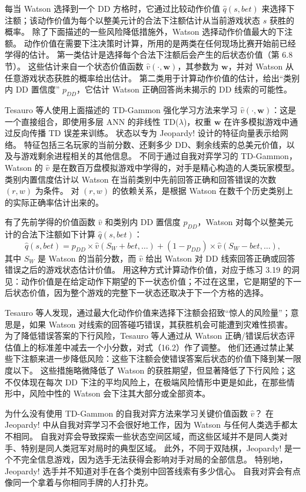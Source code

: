 \documentclass[UTF8,12pt,a4paper,fontset=fandol]{ctexart}
\begin{document}
每当 Watson 选择到一个 DD 方格时，它通过比较动作价值 $\hat q(s,bet)$ 来选择下注额；该动作价值为每个以整美元计的合法下注额估计从当前游戏状态 $s$ 获胜的概率。
除了下面描述的一些风险降低措施外，Watson 选择动作价值最大的下注额。
动作价值在需要下注决策时计算，所用的是两类在任何现场比赛开始前已经学得的估计。
第一类估计是选择每个合法下注额后会产生的后状态价值（第 6.8 节）。
这些估计来自一个状态价值函数 $\hat v(\cdot,\mathbf{w})$，其参数为 $\mathbf{w}$，并对 Watson 从任意游戏状态获胜的概率给出估计。
第二类用于计算动作价值的估计，给出“类别内 DD 置信度” $p_{DD}$，它估计 Watson 正确回答尚未揭示的 DD 线索的可能性。

Tesauro 等人使用上面描述的 TD-Gammon 强化学习方法来学习 $\hat v(\cdot,\mathbf{w})$：这是一个直接组合，即使用多层 ANN 的非线性 TD($\lambda$)，权重 $\mathbf{w}$ 在许多模拟游戏中通过反向传播 TD 误差来训练。
状态以专为 Jeopardy! 设计的特征向量表示给网络。
特征包括三名玩家的当前分数、还剩多少 DD、剩余线索的总美元价值，以及与游戏剩余进程相关的其他信息。
不同于通过自我对弈学习的 TD-Gammon，Watson 的 $\hat v$ 是在数百万盘模拟游戏中学得的，对手是精心构造的人类玩家模型。
类别内置信度估计以 Watson 在当前类别中先前回答正确和回答错误的次数 $(r,w)$ 为条件。
对 $(r,w)$ 的依赖关系，是根据 Watson 在数千个历史类别上的实际正确率估计出来的。

有了先前学得的价值函数 $\hat v$ 和类别内 DD 置信度 $p_{DD}$，Watson 对每个以整美元计的合法下注额如下计算 $\hat q(s,bet)$：
\begin{equation}
\hat q(s,bet)=p_{DD}\times \hat v(S_W+bet,\ldots)
+(1-p_{DD})\times \hat v(S_W-bet,\ldots),
\tag{16.2}
\end{equation}
其中 $S_W$ 是 Watson 的当前分数，而 $\hat v$ 给出 Watson 对 DD 线索回答正确或回答错误之后的游戏状态估计价值。
用这种方式计算动作价值，对应于练习 3.19 的洞见：动作价值是在给定动作下期望的下一状态价值；不过在这里，它是期望的下一后状态价值，因为整个游戏的完整下一状态还取决于下一个方格的选择。

Tesauro 等人发现，通过最大化动作价值来选择下注额会招致“惊人的风险量”；意思是，如果 Watson 对线索的回答碰巧错误，其获胜机会可能遭到灾难性损害。
为了降低错误答案的下行风险，Tesauro 等人通过从 Watson 正确/错误后状态评估值上的标准差中减去一个小分数，对式（16.2）作了调整。
他们还通过禁止某些下注额来进一步降低风险：这些下注额会使错误答案后状态的价值下降到某一限度以下。
这些措施略微降低了 Watson 的获胜期望，但显著降低了下行风险；这不仅体现在每次 DD 下注的平均风险上，在极端风险情形中更是如此，在那些情形中，风险中性的 Watson 会下注其大部分或全部资本。

为什么没有使用 TD-Gammon 的自我对弈方法来学习关键价值函数 $\hat v$？
在 Jeopardy! 中从自我对弈学习不会很好地工作，因为 Watson 与任何人类选手都太不相同。
自我对弈会导致探索一些状态空间区域，而这些区域并不是同人类对手、特别是同人类冠军对局时的典型区域。
此外，不同于双陆棋，Jeopardy! 是一个不完全信息游戏，因为选手无法获得会影响对手对局的全部信息。
特别地，Jeopardy! 选手并不知道对手在各个类别中回答线索有多少信心。
自我对弈会有点像同一个拿着与你相同手牌的人打扑克。
\end{document}
